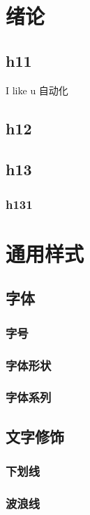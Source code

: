 \section[绪论]{绪论}
\subsection{h11}
I like u
\lipsum[1-10]
自动化
\subsection{h12}
\lipsum[1-5]
\subsection{h13}
\lipsum[1-5]
\subsubsection{h131}
\lipsum[1-5]
\clearpage
\section{通用样式}
\subsection{字体}
    \subsubsection{字号}
    \subsubsection{字体形状}
    \subsubsection{字体系列}
\subsection{文字修饰}
    \subsubsection{下划线}
    \subsubsection{波浪线}
